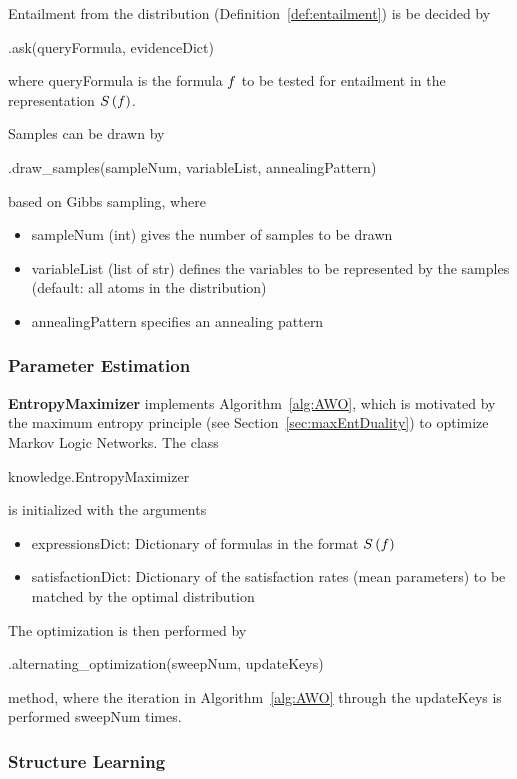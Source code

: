 Entailment from the distribution (Definition~\ref{def:entailment}) is be decided by 
\begin{centeredcode}
	.ask(queryFormula, evidenceDict)
\end{centeredcode}
where queryFormula is the formula $f$ to be tested for entailment in the representation $S\left(f\right)$.

Samples can be drawn by
\begin{centeredcode}
	.draw\_samples(sampleNum, variableList, annealingPattern)
\end{centeredcode}
based on Gibbs sampling, where
\begin{itemize}
	\item sampleNum (int) gives the number of samples to be drawn
	\item variableList (list of str) defines the variables to be represented by the samples (default: all atoms in the distribution)
	\item annealingPattern specifies an annealing pattern 
\end{itemize}


\subsubsection{Parameter Estimation}

\textbf{EntropyMaximizer} implements Algorithm~\ref{alg:AWO}, which is motivated by the maximum entropy principle (see Section~\ref{sec:maxEntDuality}) to optimize Markov Logic Networks.
The class  
\begin{centeredcode}
	knowledge.EntropyMaximizer
\end{centeredcode}
is initialized with the arguments
\begin{itemize}
	\item expressionsDict: Dictionary of formulas in the format $S\left(f\right)$ 
	\item satisfactionDict: Dictionary of the satisfaction rates (mean parameters) to be matched by the optimal distribution
\end{itemize}
The optimization is then performed by
\begin{centeredcode}
	.alternating\_optimization(sweepNum, updateKeys)
\end{centeredcode}
method, where the iteration in Algorithm~\ref{alg:AWO} through the updateKeys is performed sweepNum times.

\subsubsection{Structure Learning}

